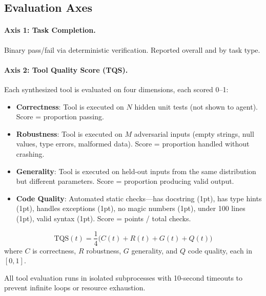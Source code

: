 \documentclass[10pt,twocolumn]{article}
\begin{document}
\subsection{Evaluation Axes}

\paragraph{Axis 1: Task Completion.} Binary pass/fail via deterministic verification. Reported overall and by task type.

\paragraph{Axis 2: Tool Quality Score (TQS).} Each synthesized tool is evaluated on four dimensions, each scored 0--1:

\begin{itemize}
\item \textbf{Correctness}: Tool is executed on $N$ hidden unit tests (not shown to agent). Score = proportion passing.
\item \textbf{Robustness}: Tool is executed on $M$ adversarial inputs (empty strings, null values, type errors, malformed data). Score = proportion handled without crashing.
\item \textbf{Generality}: Tool is executed on held-out inputs from the same distribution but different parameters. Score = proportion producing valid output.
\item \textbf{Code Quality}: Automated static checks---has docstring (1pt), has type hints (1pt), handles exceptions (1pt), no magic numbers (1pt), under 100 lines (1pt), valid syntax (1pt). Score = points / total checks.
\end{itemize}

\begin{equation}
\text{TQS}(t) = \frac{1}{4}\bigl(C(t) + R(t) + G(t) + Q(t)\bigr)
\label{eq:tqs}
\end{equation}
where $C$ is correctness, $R$ robustness, $G$ generality, and $Q$ code quality, each in $[0,1]$.

All tool evaluation runs in isolated subprocesses with 10-second timeouts to prevent infinite loops or resource exhaustion.
\end{document}
